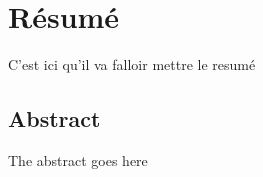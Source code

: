 \begingroup
\let\clearpage\relax
\let\cleardoublepage\relax
\let\cleardoublepage\relax

\chapter*{Résumé}
C'est ici qu'il va falloir mettre le resumé

\vfill

\begin{otherlanguage}{english}
\chapter*{Abstract}
The abstract goes here
\end{otherlanguage}

\endgroup			

\vfill